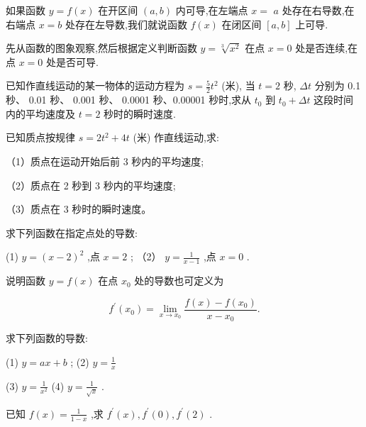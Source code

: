 \documentclass[lang=cn,newtx,10pt,scheme=chinese]{elegantbook}
\begin{document}
如果函数 \(y = f\left( x\right)\) 在开区间 \(\left( {a,b}\right)\) 内可导,在左端点 \(x =\) \(a\) 处存在右导数,在右端点 \(x = b\) 处存在左导数,我们就说函数 \(f\left( x\right)\) 在闭区间 \(\left\lbrack {a,b}\right\rbrack\) 上可导.

\begin{problemset}[练习]

\item 先从函数的图象观察,然后根据定义判断函数 \(y = \sqrt[3]{{x}^{2}}\) 在点 \(x = 0\) 处是否连续,在点 \(x = 0\) 处是否可导.

\end{problemset}

\begin{problemset}[习 题 四]

\item 已知作直线运动的某一物体的运动方程为 \(s = \frac{5}{2}{t}^{2}\) (米), 当 \(t = 2\) 秒, \({\Delta t}\) 分别为 0.1 秒、 0.01 秒、 0.001 秒、 0.0001 秒、0.00001 秒时,求从 \({t}_{0}\) 到 \({t}_{0} + {\Delta t}\) 这段时间内的平均速度及 \(t = 2\) 秒时的瞬时速度.

\item 已知质点按规律 \(s = 2{t}^{2} + {4t}\) (米) 作直线运动,求:

（1）质点在运动开始后前 3 秒内的平均速度;

（2）质点在 2 秒到 3 秒内的平均速度;

（3）质点在 3 秒时的瞬时速度。

\item 求下列函数在指定点处的导数:

(1) \(y = {\left( x - 2\right) }^{2}\) ,点 \(x = 2\) ; （2） \(y = \frac{1}{x - 1}\) ,点 \(x = 0\) .

\item 说明函数 \(y = f\left( x\right)\) 在点 \({x}_{0}\) 处的导数也可定义为

\[
{f}^{\prime }\left( {x}_{0}\right) = \mathop{\lim }\limits_{{x \rightarrow {x}_{0}}}\frac{f\left( x\right) - f\left( {x}_{0}\right) }{x - {x}_{0}}.
\]

\item 求下列函数的导数:

(1) \(y = {ax} + b\) ; (2) \(y = \frac{1}{x}\)

(3) \(y = \frac{1}{{x}^{2}}\) (4) \(y = \frac{1}{\sqrt{x}}\) .

\item 已知 \(f\left( x\right) = \frac{1}{1 - x}\) ,求 \({f}^{\prime }\left( x\right) ,{f}^{\prime }\left( 0\right) ,{f}^{\prime }\left( 2\right)\) .


\end{problemset}
\end{document}

